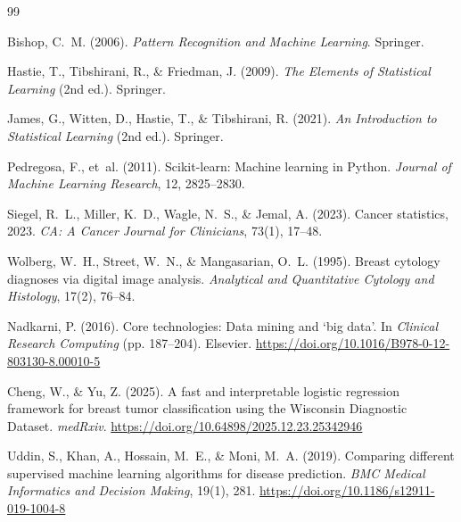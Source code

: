 \documentclass[twocolumn, fontsize=10pt]{article}
\begin{document}

\begin{thebibliography}{99}

Bishop, C.~M. (2006).
\newblock \textit{Pattern Recognition and Machine Learning}.
\newblock Springer.

Hastie, T., Tibshirani, R., \& Friedman, J. (2009).
\newblock \textit{The Elements of Statistical Learning} (2nd ed.).
\newblock Springer.

James, G., Witten, D., Hastie, T., \& Tibshirani, R. (2021).
\newblock \textit{An Introduction to Statistical Learning} (2nd ed.).
\newblock Springer.

Pedregosa, F., et~al. (2011).
\newblock Scikit-learn: Machine learning in Python.
\newblock \textit{Journal of Machine Learning Research}, 12, 2825--2830.

Siegel, R.~L., Miller, K.~D., Wagle, N.~S., \& Jemal, A. (2023).
\newblock Cancer statistics, 2023.
\newblock \textit{CA: A Cancer Journal for Clinicians}, 73(1), 17--48.

Wolberg, W.~H., Street, W.~N., \& Mangasarian, O.~L. (1995).
\newblock Breast cytology diagnoses via digital image analysis.
\newblock \textit{Analytical and Quantitative Cytology and Histology},
17(2), 76--84.

Nadkarni, P. (2016).
\newblock Core technologies: Data mining and `big data'.
\newblock In \textit{Clinical Research Computing} (pp. 187--204).
\newblock Elsevier.
\newblock \url{https://doi.org/10.1016/B978-0-12-803130-8.00010-5}

Cheng, W., \& Yu, Z. (2025).
\newblock A fast and interpretable logistic regression framework for breast tumor classification using the Wisconsin Diagnostic Dataset.
\newblock \textit{medRxiv}.
\newblock \url{https://doi.org/10.64898/2025.12.23.25342946}

Uddin, S., Khan, A., Hossain, M.~E., \& Moni, M.~A. (2019).
\newblock Comparing different supervised machine learning algorithms for disease prediction.
\newblock \textit{BMC Medical Informatics and Decision Making}, 19(1), 281.
\newblock \url{https://doi.org/10.1186/s12911-019-1004-8}

\end{thebibliography}
\end{document}
